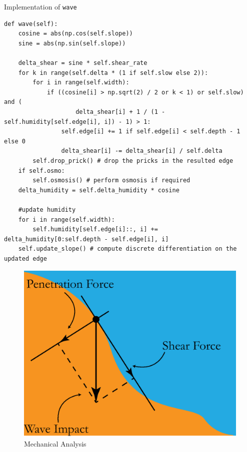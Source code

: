 \documentclass[12pt]{article}
\begin{document}
\begin{longlisting}
    \caption{Implementation of \texttt{wave}}
    \begin{verbatim}
def wave(self):
    cosine = abs(np.cos(self.slope))
    sine = abs(np.sin(self.slope))

    delta_shear = sine * self.shear_rate
    for k in range(self.delta * (1 if self.slow else 2)):
        for i in range(self.width):
            if ((cosine[i] > np.sqrt(2) / 2 or k < 1) or self.slow) and (
                    delta_shear[i] + 1 / (1 - self.humidity[self.edge[i], i]) - 1) > 1:
                self.edge[i] += 1 if self.edge[i] < self.depth - 1 else 0
                delta_shear[i] -= delta_shear[i] / self.delta
        self.drop_prick() # drop the pricks in the resulted edge
    if self.osmo:
        self.osmosis() # perform osmosis if required
    delta_humidity = self.delta_humidity * cosine

    #update humidity
    for i in range(self.width):
        self.humidity[self.edge[i]::, i] += delta_humidity[0:self.depth - self.edge[i], i]
    self.update_slope() # compute discrete differentiation on the updated edge
    \end{verbatim}
\end{longlisting}

\begin{figure}[H]
    \centering
    \includegraphics[width=0.5\linewidth]{force_separation.eps}
    \caption{Mechanical Analysis}
    \label{fig:mechanical_analysis}
\end{figure}
\end{document}
